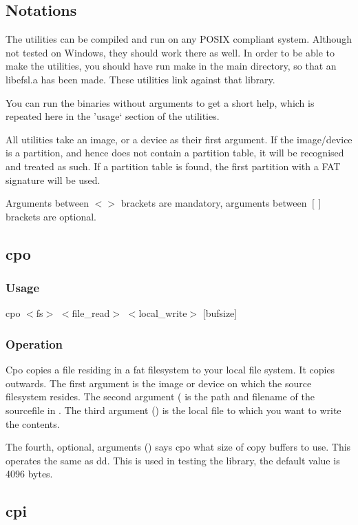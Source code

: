 \subsection{Notations}
The utilities can be compiled and run on any POSIX compliant system.
Although not tested on Windows, they should work there as well. In order
to be able to make the utilities, you should have run make in the main directory,
so that an libefsl.a has been made. These utilities link against that library.

You can run the binaries without arguments to get a short help, which is repeated
here in the 'usage` section of the utilities.

All utilities take an image, or a device as their first argument. If the image/device
is a partition, and hence does not contain a partition table, it will be recognised and treated
as such.
If a partition table is found, the first partition with a FAT signature will be used.

Arguments between $<>$ brackets are mandatory, arguments between $[]$ brackets are optional.


\subsection{cpo}
    \subsubsection*{Usage}
	cpo $<$fs$>$ $<$file\_read$>$ $<$local\_write$>$ [bufsize]
    \subsubsection*{Operation}
	Cpo copies a file residing in a fat filesystem to your local file system. It copies
	outwards. The first argument  is the image or device on which the source
	filesystem resides. The second argument ( is the path and filename
	of the sourcefile in . The third argument () is the
	local file to which you want to write the contents.

	The fourth, optional, arguments () says cpo what size of copy buffers
	to use. This operates the same as dd. This is used in testing the library, the
	default value is 4096 bytes.

\subsection{cpi}
